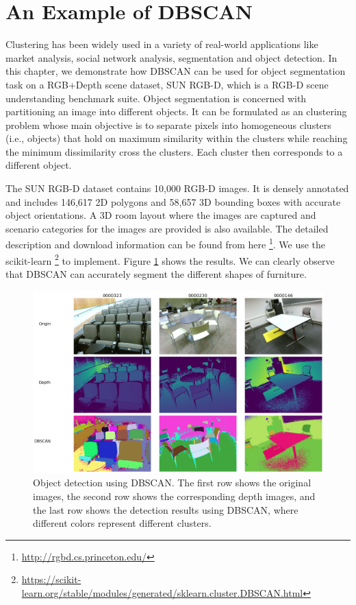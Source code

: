 \section{An Example of DBSCAN}

Clustering has been widely used in a variety of real-world applications like market analysis, social network analysis, segmentation and object detection. In this chapter, we demonstrate how DBSCAN can be used for object segmentation task on a RGB+Depth scene dataset, SUN RGB-D, which is a RGB-D scene understanding benchmark suite. Object segmentation is concerned with partitioning an image into different objects. It can be formulated as an clustering problem whose main objective is to separate pixels into homogeneous clusters (i.e., objects) that hold on maximum similarity within the clusters while reaching the minimum dissimilarity cross the clusters. Each cluster then corresponds to a different object.


The SUN RGB-D dataset contains 10,000 RGB-D images. It is densely annotated and includes 146,617 2D polygons and 58,657 3D bounding boxes with accurate object orientations. A 3D room layout where the images are captured and scenario categories for the images are provided is also available. 
The detailed description and download information can be found from here 
\footnote{\url{http://rgbd.cs.princeton.edu/}}. We use the scikit-learn 
\footnote{\url{https://scikit-learn.org/stable/modules/generated/sklearn.cluster.DBSCAN.html}}
to implement. Figure \ref{fig:scene} shows the results. We can clearly observe 
that DBSCAN can accurately segment the different shapes of furniture. 
\begin{figure}[h!]
\includegraphics[width=\textwidth]{"Part 3 - Learning Systems/Unsupervised Learning/DBScan/figures/segment.png"}
\caption{Object detection using DBSCAN. The first row shows the original 
images, the second row shows the corresponding depth images, and the last row 
shows the detection results using DBSCAN, where different colors represent different clusters.}
\label{fig:scene}
\end{figure}

